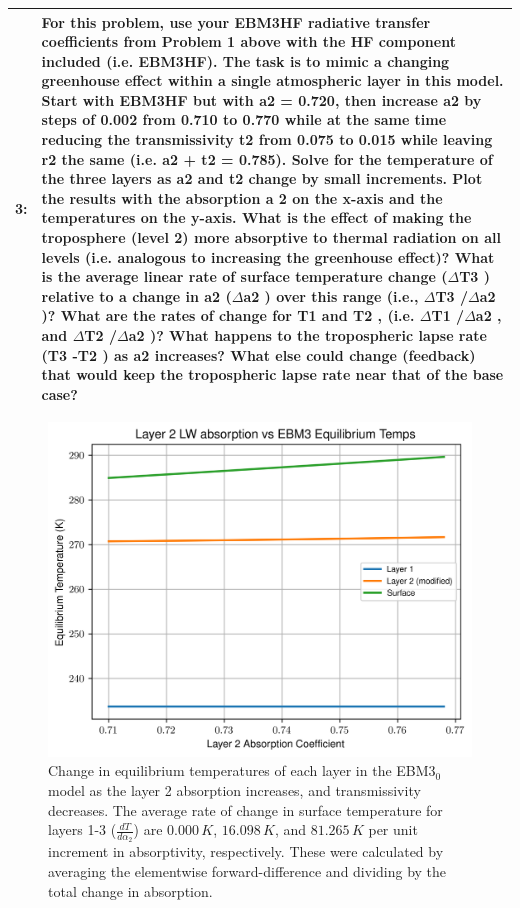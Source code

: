 \documentclass[12pt]{article}
\newcommand*{\problem}[2]{
    \begin{table}[ht]
    \centering
        \begin{tabular}{ | p{.1\linewidth} p{.9\linewidth} | }
            \hline
            \vspace{.3em}\textbf{\large#1:} & \vspace{.3em}\footnotesize{#2}\hspace{.2em}\vspace{.5em} \\ \hline
        \end{tabular}
    \end{table}
}
\begin{document}
\problem{3}{
    \footnotesize
    For this problem, use your EBM3HF radiative transfer coefficients from Problem 1
    above with the HF component included (i.e. EBM3HF). The task is to mimic a changing
    greenhouse effect within a single atmospheric layer in this model. Start with EBM3HF but with a2
    = 0.720, then increase a2 by steps of 0.002 from 0.710 to 0.770 while at the same time reducing
    the transmissivity t2 from 0.075 to 0.015 while leaving r2 the same (i.e. a2 + t2 = 0.785). Solve for
    the temperature of the three layers as a2 and t2 change by small increments. Plot the results
    with the absorption a 2 on the x-axis and the temperatures on the y-axis.
    What is the effect of making the troposphere (level 2) more absorptive to thermal radiation on all levels
    (i.e.  analogous to increasing the greenhouse effect)?
    What is the average linear rate of surface temperature change ($\Delta$T3 ) relative to a change in a2
    ($\Delta$a2 ) over this range (i.e., $\Delta$T3 /$\Delta$a2 )?
    What are the rates of change for T1 and T2 , (i.e. $\Delta$T1 /$\Delta$a2 , and $\Delta$T2 /$\Delta$a2 )?
    What happens to the tropospheric lapse rate (T3 -T2 ) as a2 increases? What else could change
    (feedback) that would keep the tropospheric lapse rate near that of the base case?}

\clearpage

\begin{figure}[h!]
    \centering
    \includegraphics[width=.70\linewidth]{ebm3hf_dTda_l2.png}
    \caption{Change in equilibrium temperatures of each layer in the EBM3$_0$ model as the layer 2 absorption increases, and transmissivity decreases. The average rate of change in surface temperature for layers 1-3 ($\frac{dT}{d\alpha_2}$) are $0.000\,\si{K}$, $16.098\,\si{K}$, and $81.265\,\si{K}$ per unit increment in absorptivity, respectively. These were calculated by averaging the elementwise forward-difference and dividing by the total change in absorption.}
    \label{dtdal2}
\end{figure}
\end{document}
